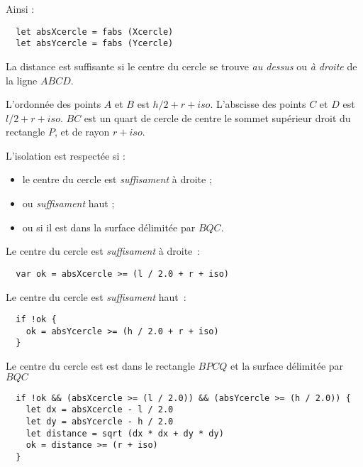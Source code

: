 Ainsi : 
\begin{lstlisting}
  let absXcercle = fabs (Xcercle)
  let absYcercle = fabs (Ycercle)
\end{lstlisting}

La distance est suffisante si le centre du cercle se trouve \emph{au dessus} ou \emph{à droite} de la ligne $ABCD$.

\begin{center}
\end{center}

L'ordonnée des points $A$ et $B$ est $ h / 2 + r + iso$. L'abscisse des points $C$ et $D$ est $ l / 2 + r + iso$. $BC$ est un quart de cercle de centre le sommet supérieur droit du rectangle $P$, et de rayon $r + iso$.

L'isolation est respectée si :
\begin{itemize}
  \item le centre du cercle est \emph{suffisament} à droite ;
  \item ou \emph{suffisament} haut ;
  \item ou si il est dans la surface délimitée par $BQC$.
\end{itemize}

Le centre du cercle est \emph{suffisament} à droite~:
\begin{lstlisting}
  var ok = absXcercle >= (l / 2.0 + r + iso)
\end{lstlisting}


Le centre du cercle est \emph{suffisament} haut~:
\begin{lstlisting}
  if !ok {
    ok = absYcercle >= (h / 2.0 + r + iso)
  }
\end{lstlisting}

Le centre du cercle est est dans le rectangle $BPCQ$ et la surface délimitée par $BQC$
\begin{lstlisting}
  if !ok && (absXcercle >= (l / 2.0)) && (absYcercle >= (h / 2.0)) {
    let dx = absXcercle - l / 2.0
    let dy = absYcercle - h / 2.0
    let distance = sqrt (dx * dx + dy * dy)
    ok = distance >= (r + iso)
  }
\end{lstlisting}
